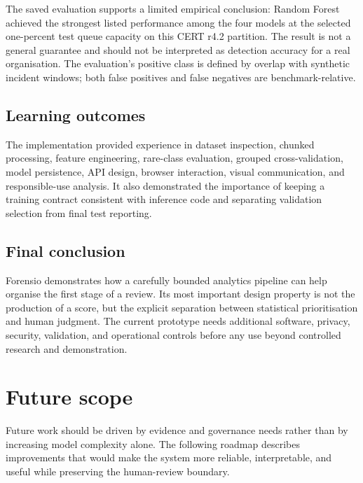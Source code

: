 \documentclass[12pt,a4paper,oneside]{report}
\begin{document}
The saved evaluation supports a limited empirical conclusion:
Random Forest achieved the strongest listed performance among the
four models at the selected one-percent test queue capacity on this
CERT r4.2 partition. The result is not a general guarantee and should
not be interpreted as detection accuracy for a real organisation.
The evaluation's positive class is defined by overlap with synthetic
incident windows; both false positives and false negatives are
benchmark-relative.

\section{Learning outcomes}
The implementation provided experience in dataset inspection,
chunked processing, feature engineering, rare-class evaluation,
grouped cross-validation, model persistence, API design, browser
interaction, visual communication, and responsible-use analysis.
It also demonstrated the importance of keeping a training contract
consistent with inference code and separating validation selection
from final test reporting.

\section{Final conclusion}
Forensio demonstrates how a carefully bounded analytics pipeline can
help organise the first stage of a review. Its most important design
property is not the production of a score, but the explicit separation
between statistical prioritisation and human judgment. The current
prototype needs additional software, privacy, security, validation,
and operational controls before any use beyond controlled research
and demonstration.

\chapter{Future scope}
\label{chap:future}
Future work should be driven by evidence and governance needs rather
than by increasing model complexity alone. The following roadmap
describes improvements that would make the system more reliable,
interpretable, and useful while preserving the human-review boundary.
\end{document}
